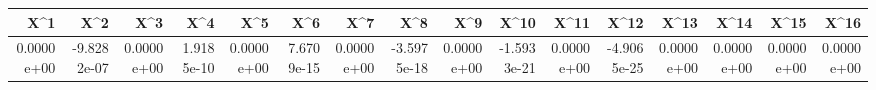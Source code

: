 \begin{tabular}{rrrrrrrrrrrrrrrr}
\toprule
       X\textasciicircum 1 &         X\textasciicircum 2 &        X\textasciicircum 3 &        X\textasciicircum 4 &        X\textasciicircum 5 &        X\textasciicircum 6 &        X\textasciicircum 7 &         X\textasciicircum 8 &        X\textasciicircum 9 &        X\textasciicircum 10 &       X\textasciicircum 11 &        X\textasciicircum 12 &       X\textasciicircum 13 &       X\textasciicircum 14 &       X\textasciicircum 15 &       X\textasciicircum 16 \\
\midrule
0.0000e+00 & -9.8282e-07 & 0.0000e+00 & 1.9185e-10 & 0.0000e+00 & 7.6709e-15 & 0.0000e+00 & -3.5975e-18 & 0.0000e+00 & -1.5933e-21 & 0.0000e+00 & -4.9065e-25 & 0.0000e+00 & 0.0000e+00 & 0.0000e+00 & 0.0000e+00 \\
\bottomrule
\end{tabular}
